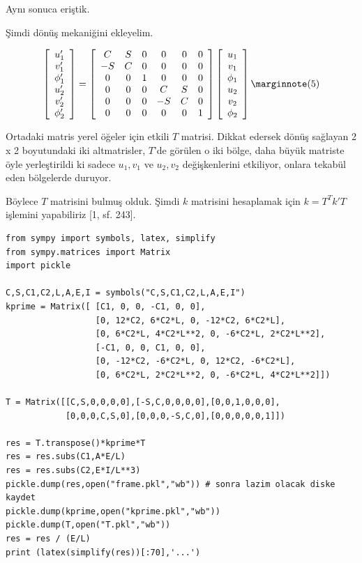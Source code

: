 \documentclass[12pt,fleqn]{article}\usepackage{../../common}
\begin{document}
Aynı sonuca eriştik.

Şimdi dönüş mekaniğini ekleyelim.

$$
\left[\begin{array}{ccc}
u'_1 \\ v'_1 \\ \phi'_1 \\ u'_2 \\ v'_2 \\ \phi'_2 
\end{array}\right] =
\left[\begin{array}{cccccc}
C & S & 0 & 0 & 0 & 0 \\
-S & C & 0 & 0 & 0 & 0 \\
0 & 0 & 1 & 0 & 0 & 0 \\
0 & 0 & 0 & C & S & 0 \\
0 & 0 & 0 & -S & C & 0 \\
0 & 0 & 0 & 0 & 0 & 1
\end{array}\right]
\left[\begin{array}{ccc}
u_1 \\ v_1 \\ \phi_1 \\ u_2 \\ v_2 \\ \phi_2 
\end{array}\right]
\mlabel{5}
$$

Ortadaki matris yerel öğeler için etkili $T$ matrisi. Dikkat edersek dönüş
sağlayan 2 x 2 boyutundaki iki altmatrisler, $T$'de görülen o iki bölge, daha
büyük matriste öyle yerleştirildi ki sadece $u_1,v_1$ ve $u_2,v_2$
değişkenlerini etkiliyor, onlara tekabül eden bölgelerde duruyor.

Böylece $T$ matrisini bulmuş olduk. Şimdi $k$ matrisini hesaplamak için
$k = T^T k' T$ işlemini yapabiliriz [1, sf. 243].

\begin{verbatim}
from sympy import symbols, latex, simplify
from sympy.matrices import Matrix
import pickle

C,S,C1,C2,L,A,E,I = symbols("C,S,C1,C2,L,A,E,I")
kprime = Matrix([ [C1, 0, 0, -C1, 0, 0],
                  [0, 12*C2, 6*C2*L, 0, -12*C2, 6*C2*L],
                  [0, 6*C2*L, 4*C2*L**2, 0, -6*C2*L, 2*C2*L**2],
                  [-C1, 0, 0, C1, 0, 0],
                  [0, -12*C2, -6*C2*L, 0, 12*C2, -6*C2*L],
                  [0, 6*C2*L, 2*C2*L**2, 0, -6*C2*L, 4*C2*L**2]])

T = Matrix([[C,S,0,0,0,0],[-S,C,0,0,0,0],[0,0,1,0,0,0],
            [0,0,0,C,S,0],[0,0,0,-S,C,0],[0,0,0,0,0,1]])

res = T.transpose()*kprime*T
res = res.subs(C1,A*E/L) 
res = res.subs(C2,E*I/L**3)
pickle.dump(res,open("frame.pkl","wb")) # sonra lazim olacak diske kaydet
pickle.dump(kprime,open("kprime.pkl","wb"))
pickle.dump(T,open("T.pkl","wb"))
res = res / (E/L) 
print (latex(simplify(res))[:70],'...')
\end{verbatim}
\end{document}
